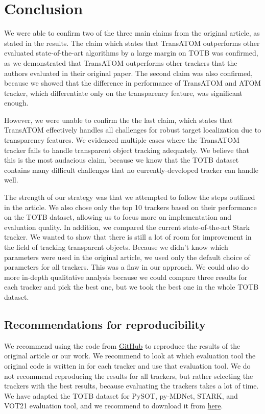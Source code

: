 \section{Conclusion}
We were able to confirm two of the three main claims from the original article, as stated in the results. The claim which states that TransATOM outperforms other evaluated state-of-the-art algorithms by a large margin on TOTB was confirmed, as we demonstrated that TransATOM outperforms other trackers that the authors evaluated in their original paper. The second claim was also confirmed, because we showed that the difference in performance of TransATOM and ATOM tracker, which differentiate only on the transparency feature, was significant enough.

However, we were unable to confirm the the last claim, which states that TransATOM effectively handles all challenges for robust target localization due to transparency features. We evidenced multiple cases where the TransATOM tracker fails to handle transparent object tracking adequately. We believe that this is the most audacious claim, because we know that the TOTB dataset contains many difficult challenges that no currently-developed tracker can handle well.

The strength of our strategy was that we attempted to follow the steps outlined in the article. We also chose only the top 10 trackers based on their performance on the TOTB dataset, allowing us to focus more on implementation and evaluation quality. In addition, we compared the current state-of-the-art Stark tracker. We wanted to show that there is still a lot of room for improvement in the field of tracking transparent objects. Because we didn't know which parameters were used in the original article, we used only the default choice of parameters for all trackers. This was a flaw in our approach. We could also do more in-depth qualitative analysis because we could compare three results for each tracker and pick the best one, but we took the best one in the whole TOTB dataset.

\subsection{Recommendations for reproducibility}
We recommend using the code from \href{https://anonymous.4open.science/r/TOTB-reproducability-009A/}{GitHub} to reproduce the results of the original article or our work. We recommend to look at which evaluation tool the original code is written in for each tracker and use that evaluation tool. We do not recommend reproducing the results for all trackers, but rather selecting the trackers with the best results, because evaluating the trackers takes a lot of time. We have adapted the TOTB dataset for PySOT, py-MDNet, STARK, and VOT21 evaluation tool, and we recommend to download it from \href{https://drive.google.com/drive/folders/1vkrWedoy5_VoRXUmmZwrAu7rv5tImrhl?usp=sharing}{here}.

\nocite{fan2021transparent} 
\nocite{segmenting}
\nocite{prdimp}
\nocite{dimp}
\nocite{atom}
\nocite{siammask}
\nocite{siamrpn}
\nocite{siamrp}
\nocite{siam2}
\nocite{mdnet}
\nocite{stark}
